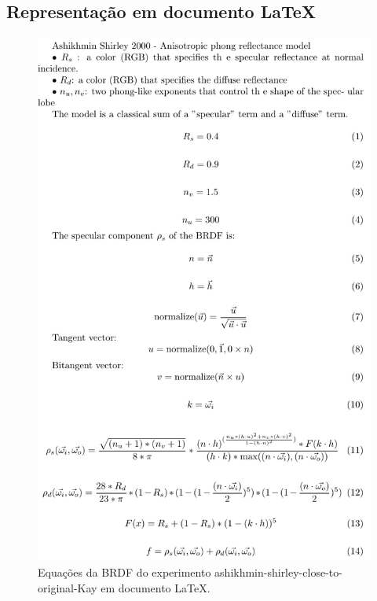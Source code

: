 \subsection{Representação em documento \LaTeX{}}
\begin{figure}[H]
    \caption{\label{fig-ashikhmin-shirley-close-to-original-eqlang-latex} \small Equações da BRDF do experimento ashikhmin-shirley-close-to-original-Kay em documento \LaTeX{}.}
    \begin{center}
        \includegraphics[scale=0.92]{./Imagens/brdfs/ashikhmin-shirley-close-to-original.pdf}
    \end{center}
\end{figure}

